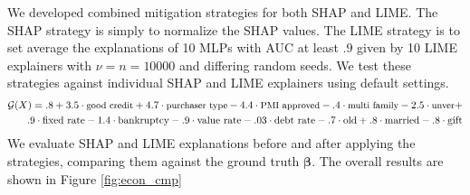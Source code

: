 \documentclass[12pt]{article}  %
\begin{document}
  We developed combined mitigation strategies for both SHAP and LIME. The SHAP strategy is simply to normalize the SHAP values. The LIME strategy is to set average the explanations of 10 MLPs with AUC at least $.9$ given by 10 LIME explainers with $\nu=n=10000$ and differing random seeds. We test these strategies against individual SHAP and LIME explainers using default settings.
  \vspace{-3mm}
  \begin{eqnarray}
  \label{eqn:econ_gt}
  \small
    \mathcal{G}(X) =.8 + 3.5\cdot \text{good credit} + 4.7\cdot \text{purchaser type} -4.4 \cdot \text{PMI approved} - .4 \cdot \text{multi family} -2.5 \cdot \text{unver} + \nonumber \\ .9 \cdot \text{fixed rate} - 1.4 \cdot \text{bankruptcy} - .9 \cdot \text{value rate} - .03 \cdot \text{debt rate} - .7 \cdot \text{old} + .8 \cdot \text{married} - .8 \cdot \text{gift}\vspace{-3mm}
  \end{eqnarray}
We evaluate SHAP and LIME explanations before and after applying the strategies, comparing them against the ground truth $\boldsymbol{\beta}$. The overall results are shown in Figure \ref{fig:econ_cmp}
\end{document}
